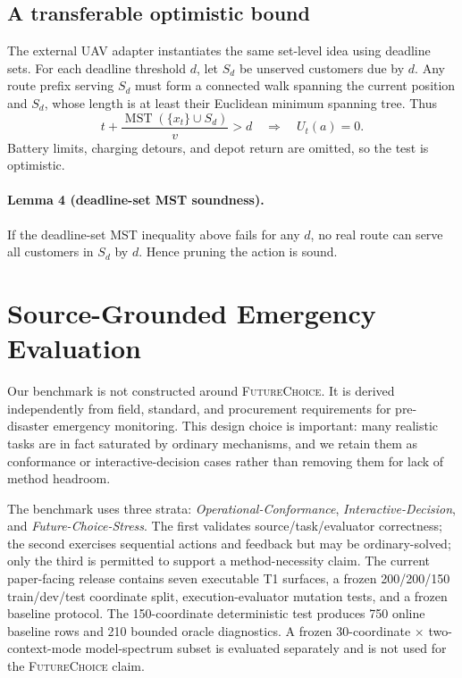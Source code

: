 \documentclass[conference]{IEEEtran}
\newcommand{\futurechoice}{\textsc{FutureChoice}\xspace}
\begin{document}
\subsection{A transferable optimistic bound}
The external UAV adapter instantiates the same set-level idea using deadline sets. For each deadline threshold $d$, let $S_d$ be unserved customers due by $d$. Any route prefix serving $S_d$ must form a connected walk spanning the current position and $S_d$, whose length is at least their Euclidean minimum spanning tree. Thus
\begin{equation}
t+\frac{\operatorname{MST}(\{x_t\}\cup S_d)}{v}>d
\quad\Longrightarrow\quad U_t(a)=0.
\end{equation}
Battery limits, charging detours, and depot return are omitted, so the test is optimistic.

\paragraph{Lemma 4 (deadline-set MST soundness).}
If the deadline-set MST inequality above fails for any $d$, no real route can serve all customers in $S_d$ by $d$. Hence pruning the action is sound.

\section{Source-Grounded Emergency Evaluation}
\label{sec:benchmark}
Our benchmark is not constructed around \futurechoice. It is derived independently from field, standard, and procurement requirements for pre-disaster emergency monitoring. This design choice is important: many realistic tasks are in fact saturated by ordinary mechanisms, and we retain them as conformance or interactive-decision cases rather than removing them for lack of method headroom.

The benchmark uses three strata: \emph{Operational-Conformance}, \emph{Interactive-Decision}, and \emph{Future-Choice-Stress}. The first validates source/task/evaluator correctness; the second exercises sequential actions and feedback but may be ordinary-solved; only the third is permitted to support a method-necessity claim. The current paper-facing release contains seven executable T1 surfaces, a frozen 200/200/150 train/dev/test coordinate split, execution-evaluator mutation tests, and a frozen baseline protocol. The 150-coordinate deterministic test produces 750 online baseline rows and 210 bounded oracle diagnostics. A frozen 30-coordinate $\times$ two-context-mode model-spectrum subset is evaluated separately and is not used for the \futurechoice claim.
\end{document}
